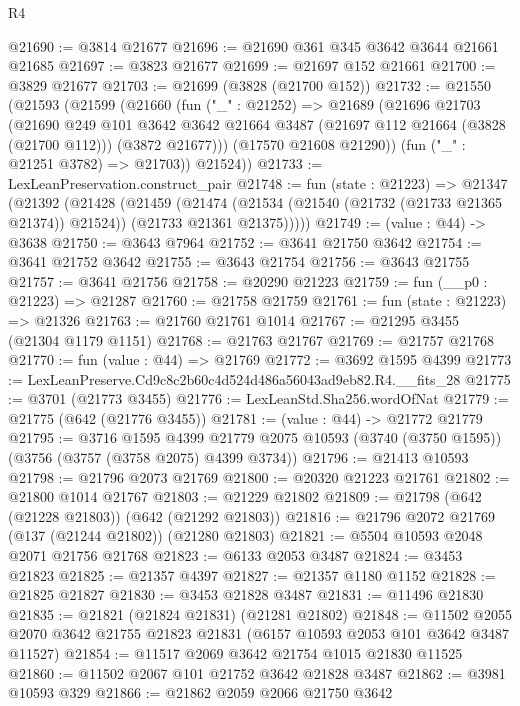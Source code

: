 \begin{lexlean}{R4}
\begin{coremodule}
@21690 := @3814 @21677
@21696 := @21690 @361 @345 @3642 @3644 @21661 @21685
@21697 := @3823 @21677
@21699 := @21697 @152 @21661
@21700 := @3829 @21677
@21703 := @21699 (@3828 (@21700 @152))
@21732 := @21550
    (@21593
      (@21599
        (@21660
          (fun ("_" : @21252) =>
          @21689
            (@21696
              @21703
              (@21690
                @249
                @101
                @3642
                @3642
                @21664
                @3487
                (@21697 @112 @21664 (@3828 (@21700 @112)))
                (@3872 @21677)))
            (@17570 @21608 @21290))
          (fun ("_" : @21251 @3782) => @21703))
        @21524))
@21733 := LexLeanPreservation.construct_pair
@21748 := fun (state : @21223) =>
  @21347
    (@21392
      (@21428
        (@21459
          (@21474
            (@21534 (@21540 (@21732 (@21733 @21365 @21374)) @21524))
            (@21733 @21361 @21375)))))
@21749 := (value : @44) -> @3638
@21750 := @3643 @7964
@21752 := @3641 @21750 @3642
@21754 := @3641 @21752 @3642
@21755 := @3643 @21754
@21756 := @3643 @21755
@21757 := @3641 @21756
@21758 := @20290 @21223
@21759 := fun (__p0 : @21223) => @21287
@21760 := @21758 @21759
@21761 := fun (state : @21223) => @21326
@21763 := @21760 @21761 @1014
@21767 := @21295 @3455 (@21304 @1179 @1151)
@21768 := @21763 @21767
@21769 := @21757 @21768
@21770 := fun (value : @44) => @21769
@21772 := @3692 @1595 @4399
@21773 := LexLeanPreserve.Cd9c8c2b60c4d524d486a56043ad9eb82.R4.__fits_28
@21775 := @3701 (@21773 @3455)
@21776 := LexLeanStd.Sha256.wordOfNat
@21779 := @21775 (@642 (@21776 @3455))
@21781 := (value : @44) -> @21772 @21779
@21795 := @3716
    @1595
    @4399
    @21779
    @2075
    @10593
    (@3740 (@3750 @1595))
    (@3756 (@3757 (@3758 @2075) @4399 @3734))
@21796 := @21413 @10593
@21798 := @21796 @2073 @21769
@21800 := @20320 @21223 @21761
@21802 := @21800 @1014 @21767
@21803 := @21229 @21802
@21809 := @21798 (@642 (@21228 @21803)) (@642 (@21292 @21803))
@21816 := @21796 @2072 @21769 (@137 (@21244 @21802)) (@21280 @21803)
@21821 := @5504 @10593 @2048 @2071 @21756 @21768
@21823 := @6133 @2053 @3487
@21824 := @3453 @21823
@21825 := @21357 @4397
@21827 := @21357 @1180 @1152
@21828 := @21825 @21827
@21830 := @3453 @21828 @3487
@21831 := @11496 @21830
@21835 := @21821 (@21824 @21831) (@21281 @21802)
@21848 := @11502 @2055 @2070 @3642 @21755 @21823 @21831 (@6157 @10593 @2053 @101 @3642 @3487 @11527)
@21854 := @11517 @2069 @3642 @21754 @1015 @21830 @11525
@21860 := @11502 @2067 @101 @21752 @3642 @21828 @3487
@21862 := @3981 @10593 @329
@21866 := @21862 @2059 @2066 @21750 @3642

\end{coremodule}
\end{lexlean}

